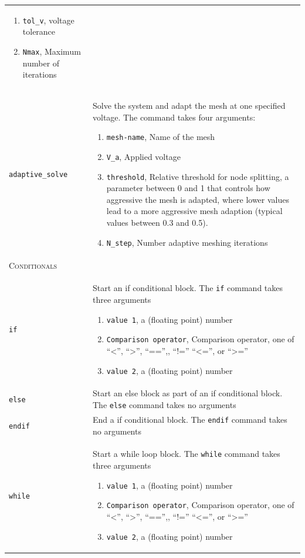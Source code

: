 \documentclass[noshowpacs,preprintnumbers,amsmath,amssymb, letter]{revtex4}
\begin{document}
\begin{longtable}{p{}p{}}
\begin{enumerate}
\item \texttt{tol\_v}, voltage tolerance
\item \texttt{Nmax}, Maximum number of iterations
\end{enumerate}\\
\texttt{adaptive\_solve}	&  Solve the system and adapt the mesh at one specified voltage. The command takes four arguments:
\begin{enumerate}
\item \texttt{mesh-name}, Name of the mesh
\item \texttt{V\_a}, Applied voltage
\item \texttt{threshold}, Relative threshold for node splitting, a parameter between 0 and 1 that controls how aggressive the mesh is adapted, where lower values lead to a more aggressive mesh adaption (typical values between 0.3 and 0.5).
\item \texttt{N\_step}, Number adaptive meshing iterations
\end{enumerate}\\
\multicolumn{2}{l}{\textsc{Conditionals}} \\*
\hline
\texttt{if}	&  Start an if conditional block. The \texttt{if} command takes three arguments
\begin{enumerate}
\item \texttt{value 1}, a (floating point) number
\item \texttt{Comparison operator}, Comparison operator, one of ``\textless'', ``\textgreater'', ``=='',, ``!='' ``\textless ='', or ``\textgreater =''
\item \texttt{value 2},  a (floating point) number
\end{enumerate}\\
\texttt{else}	&  Start an else block as part of an if conditional block. The \texttt{else} command takes no arguments\\
\texttt{endif}	&  End a if conditional block. The \texttt{endif} command takes no arguments\\
\texttt{while}	&  Start a while loop block. The \texttt{while} command takes three arguments
\begin{enumerate}
\item \texttt{value 1}, a (floating point) number
\item \texttt{Comparison operator}, Comparison operator, one of ``\textless'', ``\textgreater'', ``=='',, ``!='' ``\textless ='', or ``\textgreater =''
\item \texttt{value 2},  a (floating point) number

\end{enumerate}
\end{longtable}
\end{document}
